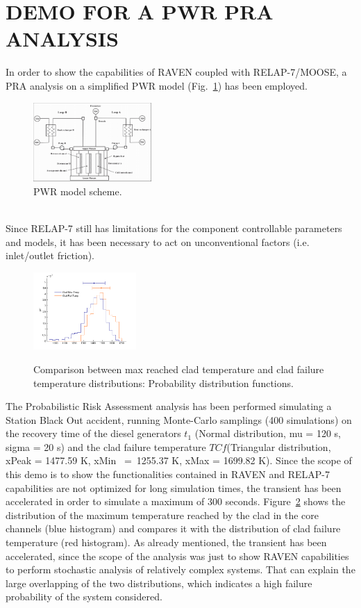 \documentclass{anstrans}
\begin{document}
\section{DEMO FOR A PWR PRA ANALYSIS}
In order to show the capabilities of RAVEN coupled with RELAP-7/MOOSE, a PRA analysis on a simplified PWR model (Fig.~\ref{fig:PWRmodel}) has been employed.
\begin{figure}
   \centering
    \includegraphics[width=0.4\textwidth]{figures/PWR_TMI_SCHEME.PNG}
    \caption{PWR model scheme.}
    \label{fig:PWRmodel}
\end{figure}
\\Since RELAP-7 still has limitations for the component controllable parameters and models, it has been necessary to act on unconventional factors (i.e. inlet/outlet friction).
\begin{figure} [H]
\centering
  \centering
  \includegraphics[width=0.35\textwidth]{figures/PRA_dist2.png}
  \label{fig:pdf_temp}
   \caption{Comparison between max reached clad temperature and clad failure temperature distributions: Probability distribution functions.}
\label{fig:distributionResults}
\end{figure}

The Probabilistic Risk Assessment analysis has been performed simulating a Station Black Out accident, running Monte-Carlo samplings (400 simulations) on the recovery time of the diesel generators $t_{1}$ (Normal distribution, mu = 120 s, sigma = 20 s) and the clad failure temperature $TC{f}$(Triangular distribution, xPeak = 1477.59 K, xMin~ =~1255.37 K, xMax = 1699.82 K). Since the scope of this demo is to show the functionalities contained in RAVEN and RELAP-7 capabilities are not optimized for long simulation times, the transient has been accelerated in order to simulate a maximum of 300 seconds. 
Figure~\ref{fig:distributionResults} shows the distribution of the maximum temperature reached by the clad in the core channels (blue histogram) and compares it with the distribution of clad failure temperature (red histogram).
As already mentioned, the transient has been accelerated, since the scope of the analysis was just to show RAVEN capabilities to perform stochastic analysis of relatively complex systems. That can explain the large overlapping of the two distributions, which indicates a high failure probability of the system considered.                               
\end{document}
